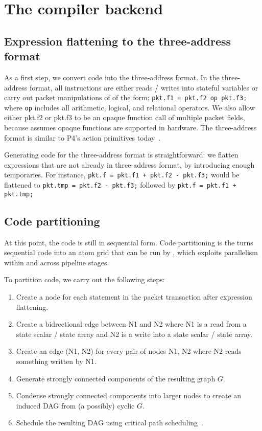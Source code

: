 \section{The \pktlanguage compiler backend}

\subsection{Expression flattening to the three-address format}
As a first step, we convert code into the three-address format. In the
three-address format, all instructions are either reads / writes into stateful
variables or carry out packet manipulations of of the form: \texttt{pkt.f1 =
pkt.f2 op pkt.f3;} where \texttt{op} includes all arithmetic, logical, and
relational operators. We also allow either pkt.f2 or pkt.f3 to be an opaque
function call of multiple packet fields, because \pktlanguage assumes opaque
functions are supported in hardware. The three-address format is similar to
P4's action primitives today~\cite{p4spec}.

Generating code for the three-address format is straightforward: we flatten
expressions that are not already in three-address format, by introducing enough
temporaries. For instance, \texttt{pkt.f = pkt.f1 + pkt.f2 - pkt.f3;} would be
flattened to \texttt{pkt.tmp = pkt.f2 - pkt.f3;} followed by \texttt{pkt.f =
pkt.f1 + pkt.tmp;}

\subsection{Code partitioning}
At this point, the code is still in sequential form. Code partitioning is the
turns sequential code into an atom grid that can be run by \absmachine , which
exploits parallelism within and across pipeline stages.

To partition code, we carry out the following steps:
\begin{enumerate}
  \item Create a node for each statement in the packet transaction after expression flattening. %
  \item Create a bidrectional edge between N1 and N2 where N1 is a read from a state scalar / state array and N2 is a write into a state scalar / state array.
  \item Create an edge (N1, N2) for every pair of nodes N1, N2 where N2 reads something written by N1.
  \item Generate strongly connected components of the resulting graph $G$.
  \item Condense strongly connected components into larger nodes to create an induced DAG from (a possibly) cyclic $G$.
  \item Schedule the resulting DAG using critical path scheduling~\cite{crit_path_sched}.
\end{enumerate}


